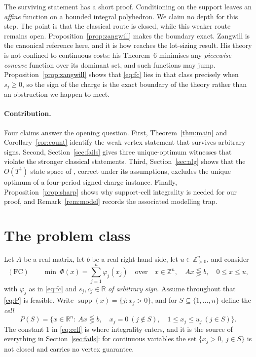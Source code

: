 \documentclass[review,11pt]{elsarticle}
\theoremstyle{remark}
\theoremstyle{definition}
\newcommand{\R}{\mathbb{R}}
\newcommand{\Z}{\mathbb{Z}}
\newcommand{\supp}{\operatorname{supp}}
\begin{document}
The surviving statement has a short proof. Conditioning on the support leaves an
\emph{affine} function on a bounded integral polyhedron. We claim no depth for this step.
The point is that the classical route is closed, while this weaker route remains open.
Proposition~\ref{prop:zangwill} makes the boundary exact.
Zangwill \cite{zangwill67} is the canonical reference here, and it is how \cite{love73}
reaches the lot-sizing result. His theory is not confined to continuous costs: his
Theorem~6 minimises any \emph{piecewise concave} function over its dominant set, and such
functions may jump. Proposition~\ref{prop:zangwill} shows that \eqref{eq:fc} lies in that
class precisely when $s_j\ge0$, so the sign of the charge is the exact boundary of the
theory rather than an obstruction we happen to meet.

\paragraph{Contribution.} Four claims answer the opening question. First,
Theorem~\ref{thm:main} and Corollary~\ref{cor:count} identify the weak vertex statement
that survives arbitrary signs. Second, Section~\ref{sec:fails} gives three
unique-optimum witnesses that violate the stronger classical statements. Third,
Section~\ref{sec:alg} shows that the $O(T^4)$ state space of \cite{apr15}, correct under
its assumptions, excludes the unique optimum of a four-period signed-charge instance.
Finally, Proposition~\ref{prop:sharp} shows why support-cell integrality is needed for our
proof, and Remark~\ref{rem:model} records the associated modelling trap.

\section{The problem class}

Let $A$ be a real matrix, let $b$ be a real right-hand side, let
$u\in\Z_{>0}^n$, and consider
\begin{equation}\label{eq:P}
(\mathrm{FC})\qquad
\min\ \Phi(x)=\sum_{j=1}^{n}\varphi_j(x_j)
\quad\text{over}\quad x\in\Z^n,\quad Ax\lesseqgtr b,\quad 0\le x\le u,
\end{equation}
with $\varphi_j$ as in \eqref{eq:fc} and $s_j,c_j\in\R$ \emph{of arbitrary sign}.
Assume throughout that \eqref{eq:P} is feasible.
Write $\supp(x)=\{j:x_j>0\}$, and for $S\subseteq\{1,\dots,n\}$ define the \emph{cell}
\begin{equation}\label{eq:cell}
P(S)=\bigl\{x\in\R^n:\ Ax\lesseqgtr b,\quad x_j=0\ (j\notin S),\quad 1\le x_j\le u_j\ (j\in S)\bigr\}.
\end{equation}
The constant $1$ in \eqref{eq:cell} is where integrality enters, and it is the source of
everything in Section~\ref{sec:fails}: for continuous variables the set
$\{x_j>0,\ j\in S\}$ is not closed and carries no vertex guarantee.
\end{document}
